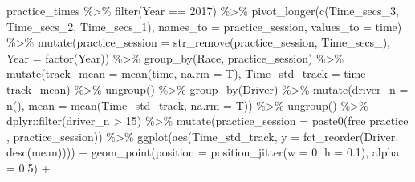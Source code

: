 \documentclass[
]{book}
\newenvironment{Shaded}{\begin{snugshade}}{\end{snugshade}}
\newcommand{\AttributeTok}[1]{\textcolor[rgb]{0.77,0.63,0.00}{#1}}
\newcommand{\DecValTok}[1]{\textcolor[rgb]{0.00,0.00,0.81}{#1}}
\newcommand{\FloatTok}[1]{\textcolor[rgb]{0.00,0.00,0.81}{#1}}
\newcommand{\FunctionTok}[1]{\textcolor[rgb]{0.00,0.00,0.00}{#1}}
\newcommand{\NormalTok}[1]{#1}
\newcommand{\SpecialCharTok}[1]{\textcolor[rgb]{0.00,0.00,0.00}{#1}}
\newcommand{\StringTok}[1]{\textcolor[rgb]{0.31,0.60,0.02}{#1}}
\begin{document}
\begin{Shaded}
\begin{Highlighting}[]
\NormalTok{practice\_times }\SpecialCharTok{\%\textgreater{}\%}
  \FunctionTok{filter}\NormalTok{(Year }\SpecialCharTok{==} \DecValTok{2017}\NormalTok{) }\SpecialCharTok{\%\textgreater{}\%} 
  \FunctionTok{pivot\_longer}\NormalTok{(}\FunctionTok{c}\NormalTok{(Time\_secs\_3, Time\_secs\_2, Time\_secs\_1), }\AttributeTok{names\_to =} \StringTok{\textquotesingle{}practice\_session\textquotesingle{}}\NormalTok{, }\AttributeTok{values\_to =} \StringTok{\textquotesingle{}time\textquotesingle{}}\NormalTok{) }\SpecialCharTok{\%\textgreater{}\%}
  \FunctionTok{mutate}\NormalTok{(}\AttributeTok{practice\_session =} \FunctionTok{str\_remove}\NormalTok{(practice\_session, }\StringTok{\textquotesingle{}Time\_secs\_\textquotesingle{}}\NormalTok{),}
         \AttributeTok{Year =} \FunctionTok{factor}\NormalTok{(Year)) }\SpecialCharTok{\%\textgreater{}\%}
   \FunctionTok{group\_by}\NormalTok{(Race, practice\_session) }\SpecialCharTok{\%\textgreater{}\%}
   \FunctionTok{mutate}\NormalTok{(}\AttributeTok{track\_mean =} \FunctionTok{mean}\NormalTok{(time, }\AttributeTok{na.rm =}\NormalTok{ T),}
          \AttributeTok{Time\_std\_track =}\NormalTok{ time }\SpecialCharTok{{-}}\NormalTok{ track\_mean) }\SpecialCharTok{\%\textgreater{}\%} 
   \FunctionTok{ungroup}\NormalTok{() }\SpecialCharTok{\%\textgreater{}\%} 
   \FunctionTok{group\_by}\NormalTok{(Driver) }\SpecialCharTok{\%\textgreater{}\%} 
   \FunctionTok{mutate}\NormalTok{(}\AttributeTok{driver\_n =} \FunctionTok{n}\NormalTok{(),}
          \AttributeTok{mean =} \FunctionTok{mean}\NormalTok{(Time\_std\_track, }\AttributeTok{na.rm =}\NormalTok{ T)) }\SpecialCharTok{\%\textgreater{}\%}
   \FunctionTok{ungroup}\NormalTok{() }\SpecialCharTok{\%\textgreater{}\%}
\NormalTok{   dplyr}\SpecialCharTok{::}\FunctionTok{filter}\NormalTok{(driver\_n }\SpecialCharTok{\textgreater{}} \DecValTok{15}\NormalTok{) }\SpecialCharTok{\%\textgreater{}\%} 
  \FunctionTok{mutate}\NormalTok{(}\AttributeTok{practice\_session =} \FunctionTok{paste0}\NormalTok{(}\StringTok{\textquotesingle{}free practice \textquotesingle{}}\NormalTok{, practice\_session)) }\SpecialCharTok{\%\textgreater{}\%}  
   \FunctionTok{ggplot}\NormalTok{(}\FunctionTok{aes}\NormalTok{(Time\_std\_track, }\AttributeTok{y =} \FunctionTok{fct\_reorder}\NormalTok{(Driver, }\FunctionTok{desc}\NormalTok{(mean)))) }\SpecialCharTok{+}
   \FunctionTok{geom\_point}\NormalTok{(}\AttributeTok{position =} \FunctionTok{position\_jitter}\NormalTok{(}\AttributeTok{w =} \DecValTok{0}\NormalTok{, }\AttributeTok{h =} \FloatTok{0.1}\NormalTok{), }\AttributeTok{alpha =} \FloatTok{0.5}\NormalTok{) }\SpecialCharTok{+}

\end{Highlighting}
\end{Shaded}
\end{document}
